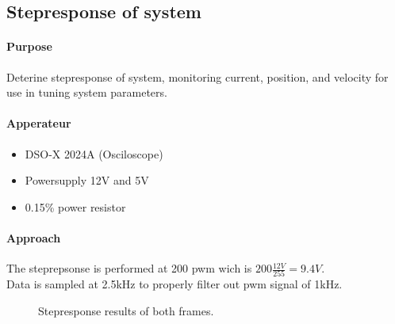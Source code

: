\documentclass[../../main]{subfiles}
\begin{document}
\subsection{Stepresponse of system}%
\label{sub:stepresponse_of_system}

\paragraph{Purpose}%
\label{par:purpose}

Deterine stepresponse of system, monitoring current, position, and velocity for use in tuning system parameters.

\paragraph{Apperateur}%
\label{par:apperateur}
\begin{itemize}
	\item DSO-X 2024A (Osciloscope)
	\item Powersupply 12\si{V} and 5\si{V}
	\item 0.1\si{\Omega}5\% power resistor
\end{itemize}


\paragraph{Approach}%
\label{par:approach}
The steprepsonse is performed at 200 pwm wich is $200\frac{12\si{V}}{255} = 9.4\si{V}$.\\
Data is sampled at 2.5\si{kHz} to properly filter out pwm signal of 1\si{kHz}.


\begin{figure}[H]
        \centering
				\def\svgwidth{0.47\columnwidth}
				\def\svgwidth{0.47\columnwidth}
				\caption{Stepresponse results of both frames.}
				\label{fig:jour_step_bot}
\end{figure}
\end{document}
